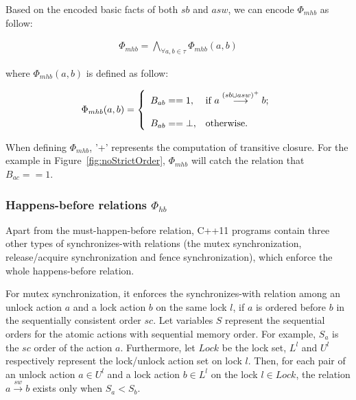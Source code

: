 \documentclass[preprint, numbers, 10pt]{sigplanconf}
\begin{document}
Based on the encoded basic facts of both $sb$ and $asw$, we can encode $\Phi_{mhb}$ as follow: 

\begin{equation}
\begin{aligned}
\Phi_{mhb} = \bigwedge_{\forall a,b\in \tau} \Phi_{mhb}(a,b)
\end{aligned}
\end{equation}

where $\Phi_{mhb}(a,b)$ is defined as follow: 

\[\Phi_{mhb}(a,b) = \left\{
  \begin{array}{l l}
    B_{ab}==1,           &  {\text{if $a \stackrel{(sb\cup asw)^+}{\longrightarrow} b$;}}\\\\
    B_{ab}==\bot,  &  \text{otherwise}.
  \end{array} \right.\]

When defining $\Phi_{mhb}$, '+' represents the computation of transitive closure. 
For the example in Figure~\ref{fig:noStrictOrder}, $\Phi_{mhb}$ will catch the relation
that $B_{ac}==1$. 

\subsubsection{Happens-before relations $\Phi_{hb}$}

Apart from the must-happen-before relation, C++11 programs 
contain three other types of synchronizes-with relations (the
mutex synchronization, release/acquire synchronization and fence synchronization),
which enforce the whole happens-before relation.  

For mutex synchronization, it enforces the synchronizes-with relation among an unlock action $a$
and a lock action $b$ on the same lock $l$, if $a$ is ordered before $b$ in the sequentially consistent 
order $sc$.  Let variables $S$ represent the sequential orders for the atomic actions with sequential
memory order. For example, $S_a$ is the $sc$ order of the action $a$. Furthermore, 
let $Lock$ be the lock set, $L^l$ and $U^l$ respectively represent the lock/unlock action set on lock $l$. 
Then, for each pair of an unlock action $a\in U^l$ and a lock action $b\in L^l$ on the lock $l\in Lock$, the 
relation $a \stackrel{sw}{\longrightarrow} b$ exists only when $S_a<S_b$.
\end{document}
